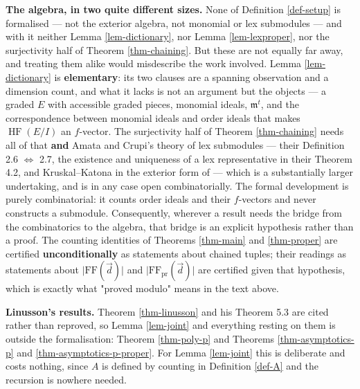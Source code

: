 \documentclass[11pt, a4paper, abstract=yes]{scrartcl}
\theoremstyle{definition}
\theoremstyle{remark}
\theoremstyle{plain}
\newcommand{\HF}{\operatorname{HF}}
\begin{document}
\begin{itemize}
\textbf{The algebra, in two quite different sizes.} None of Definition \ref{def-setup} is formalised — not
the exterior algebra, not monomial or lex submodules — and with it neither Lemma
\ref{lem-dictionary}, nor Lemma \ref{lem-lexproper}, nor the surjectivity half of Theorem
\ref{thm-chaining}. But these are not equally far away, and treating them alike would misdescribe
the work involved. Lemma \ref{lem-dictionary} is \textbf{elementary}: its two clauses are a spanning
observation and a dimension count, and what it lacks is not an argument but the objects — a
graded \(E\) with accessible graded pieces, monomial ideals, \(\mathfrak m^t\), and the
correspondence between monomial ideals and order ideals that makes \(\HF(E/I)\) an
\(f\)-vector. The surjectivity half of Theorem \ref{thm-chaining} needs all of that \textbf{and} Amata
and Crupi's theory of lex submodules — their Definition 2.6 \(\Leftrightarrow\) 2.7, the
existence and uniqueness of a lex representative in their Theorem 4.2, and Kruskal–Katona in
the exterior form of \textcite{AramovaHerzogHibi1997} — which is a substantially larger
undertaking, and is in any case open combinatorially. The formal development is
purely combinatorial: it counts order ideals and their \(f\)-vectors and never constructs a
submodule. Consequently, wherever a result needs the bridge from the combinatorics to the algebra,
that bridge is an explicit hypothesis rather than a proof. The counting identities of Theorems
\ref{thm-main} and \ref{thm-proper} are certified \textbf{unconditionally} as statements about chained tuples;
their readings as statements about \(\lvert\mathrm{FF}(\vec d)\rvert\) and
\(\lvert\mathrm{FF}_{\mathrm{pr}}(\vec d)\rvert\) are certified given that hypothesis, which
is exactly what "proved modulo" means in the text above.

\textbf{Linusson's results.} Theorem \ref{thm-linusson} and his Theorem 5.3 are cited rather than reproved,
so Lemma \ref{lem-joint} and everything resting on them is outside the formalisation: Theorem
\ref{thm-poly-p} and Theorems \ref{thm-asymptotics-p} and \ref{thm-asymptotics-p-proper}. For Lemma
\ref{lem-joint} this is deliberate and costs nothing, since \(A\) is defined by counting in
Definition \ref{def-A} and the recursion is nowhere needed.


\end{itemize}
\end{document}
